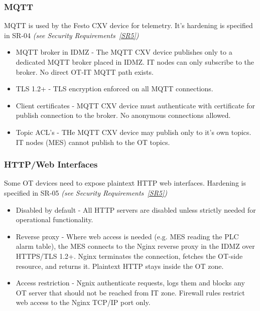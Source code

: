 \documentclass[11pt,a4paper]{article}
\begin{document}
\subsubsection{MQTT}

MQTT is used by the Festo CXV device for telemetry. It's hardening is specified in SR-04 \textit{(see Security Requirements~\ref{SR5})}

\begin{itemize}

    \item MQTT broker in IDMZ - The MQTT CXV device publishes only to a
        dedicated MQTT broker placed in IDMZ. IT nodes can only subscribe to
        the broker. No direct OT-IT MQTT path exists.

    \item TLS 1.2+ - TLS encryption enforced on all MQTT connections.

    \item Client certificates - MQTT CXV device must authenticate with
        certificate for publish connection to the broker. No anonymous
        connections allowed.

    \item Topic ACL's - THe MQTT CXV device may publish only to it's own
        topics. IT nodes (MES) cannot publish to the OT topics.

\end{itemize}

\subsubsection{HTTP/Web Interfaces}
Some OT devices need to expose plaintext HTTP web interfaces. Hardening is
specified in SR-05 \textit{(see Security Requirements~\ref{SR5})}

\begin{itemize}

    \item Disabled by default - All HTTP servers are disabled unless strictly
        needed for operational functionality.

    \item Reverse proxy - Where web access is needed (e.g. MES reading the PLC
        alarm table), the MES connects to the Nginx reverse proxy in the IDMZ
        over HTTPS/TLS 1.2+. Nginx terminates the connection, fetches the
        OT-side resource, and returns it. Plaintext HTTP stays inside the OT
        zone.

    \item Access restriction - Ngnix authenticate requests, logs them and
        blocks any OT server that should not be reached from IT zone. Firewall
        rules restrict web access to the Nginx TCP/IP port only.

\end{itemize}
\end{document}
